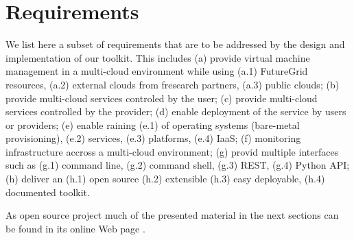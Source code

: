 \documentclass{tex/sig-alternate-2013}
\begin{document}

\section{Requirements} \label{S:requirements}

We list here a subset of requirements that are to be addressed by the
design and implementation of our toolkit. This includes (a) provide
virtual machine management in a multi-cloud environment while using
(a.1) FutureGrid resources, (a.2) external clouds from fresearch
partners, (a.3) public clouds; (b) provide multi-cloud services
controled by the user; (c) provide multi-cloud services controlled by
the provider; (d) enable deployment of the service by users or
providers; (e) enable raining (e.1) of operating systems (bare-metal
provisioning), (e.2) services, (e.3) platforms, (e.4) IaaS; (f)
monitoring infrastructure accross a multi-cloud environment; (g)
provid multiple interfaces such as (g.1) command line, (g.2) command shell, (g.3) REST,
(g.4) Python API; (h) deliver an (h.1) open source (h.2) extensible (h.3) easy
deployable, (h.4) documented toolkit.

As open source project much of the presented material in the next
sections can be found in its online Web page
\cite{github-cloudmesh}. 
\end{document}
